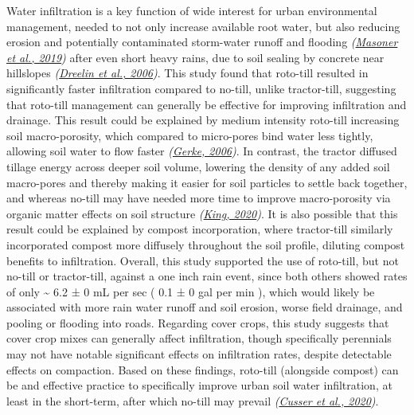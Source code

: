 \documentclass[
  12pt,
]{article}
\begin{document}
Water infiltration is a key function of wide interest for urban environmental management, needed to not only increase available root water, but also reducing erosion and potentially contaminated storm-water runoff and flooding \emph{(\protect\hyperlink{ref-masoner19}{Masoner et al., 2019})} after even short heavy rains, due to soil sealing by concrete near hillslopes \emph{(\protect\hyperlink{ref-dreelin06}{Dreelin et al., 2006})}.
This study found that roto-till resulted in significantly faster infiltration compared to no-till, unlike tractor-till, suggesting that roto-till management can generally be effective for improving infiltration and drainage.
This result could be explained by medium intensity roto-till increasing soil macro-porosity, which compared to micro-pores bind water less tightly, allowing soil water to flow faster \emph{(\protect\hyperlink{ref-gerke06}{Gerke, 2006})}.
In contrast, the tractor diffused tillage energy across deeper soil volume, lowering the density of any added soil macro-pores and thereby making it easier for soil particles to settle back together, and whereas no-till may have needed more time to improve macro-porosity via organic matter effects on soil structure \emph{(\protect\hyperlink{ref-king20}{King, 2020})}.
It is also possible that this result could be explained by compost incorporation, where tractor-till similarly incorporated compost more diffusely throughout the soil profile, diluting compost benefits to infiltration.
Overall, this study supported the use of roto-till, but not no-till or tractor-till, against a one inch rain event, since both others showed rates of only
\textasciitilde{} 6.2 ±
0 mL per sec
(
0.1 ±
0 gal per min
),
which would likely be associated with more rain water runoff and soil erosion, worse field drainage, and pooling or flooding into roads.
Regarding cover crops, this study suggests that cover crop mixes can generally affect infiltration, though specifically perennials may not have notable significant effects on infiltration rates, despite detectable effects on compaction.
Based on these findings, roto-till (alongside compost) can be and effective practice to specifically improve urban soil water infiltration, at least in the short-term, after which no-till may prevail \emph{(\protect\hyperlink{ref-cusser20}{Cusser et al., 2020})}.
\end{document}
